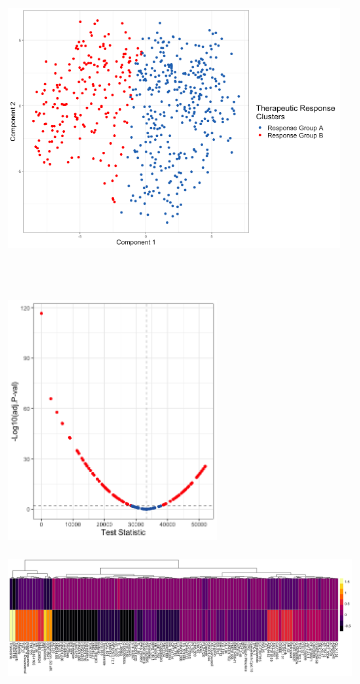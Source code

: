\documentclass[10pt, letterpaper]{article}
\begin{document}
\begin{multicols*}{2}
\begin{figure}[!ht]
    \centering
    \begin{subfigure}[t]{0.5\textwidth}
        \centering
        \includegraphics[height=2.5in]{Figures/pca.png}
        \caption{}
        \label{fig:pca}
    \end{subfigure}%
    ~
    \begin{subfigure}[t]{0.5\textwidth}
        \centering
        \includegraphics[height=2.5in]{Figures/volcano.png}
        \caption{}
        \label{fig:volcano}
    \end{subfigure}

    \begin{subfigure}[t]{\textwidth}
        \centering
        \includegraphics[width=\textwidth]{Figures/heatmap.png}
        \caption{}
        \label{fig:heatmap}
    \end{subfigure}


\end{figure}
\end{multicols*}
\end{document}
